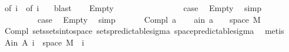 \begin{isabellebody}
\ {\isacharasterisk}{\kern0pt}{\isacharparenleft}{\kern0pt}{}{\isacharparenright}{\kern0pt}{\isacharbrackleft}{\kern0pt}of\ i{\isacharbrackright}{\kern0pt}\ {\isacharasterisk}{\kern0pt}{\isacharparenleft}{\kern0pt}{}{\isacharparenright}{\kern0pt}\ {\isacharasterisk}{\kern0pt}{\isacharasterisk}{\kern0pt}{\isacharparenleft}{\kern0pt}{}{\isacharparenright}{\kern0pt}{\isacharbrackleft}{\kern0pt}of\ i{\isacharbrackright}{\kern0pt}\ {\isacharasterisk}{\kern0pt}{\isacharasterisk}{\kern0pt}{\isacharparenleft}{\kern0pt}{}{\isacharparenright}{\kern0pt}\ \isamarkupfalse%
\ blast{\isacharplus}{\kern0pt}\isanewline
{}\isamarkupfalse%
\isanewline
\ \ \isamarkupfalse%
\ Empty\isanewline
\ \ \isacommand{{\isacharbraceleft}{\kern0pt}}\isamarkupfalse%
\isanewline
\ \ \ \ \isamarkupfalse%
\ {}\isanewline
\ \ \ \ \isamarkupfalse%
\ \isamarkupfalse%
\ {\isacharquery}{\kern0pt}case\ \isamarkupfalse%
\ Empty\ \isamarkupfalse%
\ simp\isanewline
\ \ \isamarkupfalse%
\isanewline
\ \ \ \ \isamarkupfalse%
\ {}\isanewline
\ \ \ \ \isamarkupfalse%
\ \isamarkupfalse%
\ {\isacharquery}{\kern0pt}case\ \isamarkupfalse%
\ Empty\ \isamarkupfalse%
\ simp\isanewline
\ \ \isacommand{{\isacharbraceright}{\kern0pt}}\isamarkupfalse%
\isanewline
{}\isamarkupfalse%
\isanewline
\ \ \isamarkupfalse%
\ {\isacharparenleft}{\kern0pt}Compl\ a{\isacharparenright}{\kern0pt}\isanewline
\ \ \isamarkupfalse%
\ a{\isacharunderscore}{\kern0pt}in{\isacharcolon}{\kern0pt}\ {\isachardoublequoteopen}a\ {\isasymsubseteq}\ {\isacharbraceleft}{\kern0pt}{}{\isachardot}{\kern0pt}{\isachardot}{\kern0pt}{\isacharbraceright}{\kern0pt}\ {\isasymtimes}\ space\ M{\isachardoublequoteclose}\ \isamarkupfalse%
\ Compl{\isacharparenleft}{\kern0pt}{}{\isacharparenright}{\kern0pt}\ sets{\isachardot}{\kern0pt}sets{\isacharunderscore}{\kern0pt}into{\isacharunderscore}{\kern0pt}space\ sets{\isacharunderscore}{\kern0pt}predictable{\isacharunderscore}{\kern0pt}sigma\ space{\isacharunderscore}{\kern0pt}predictable{\isacharunderscore}{\kern0pt}sigma\ \isamarkupfalse%
\ metis\isanewline
\ \ \isamarkupfalse%
\ A{\isacharunderscore}{\kern0pt}in{\isacharcolon}{\kern0pt}\ {\isachardoublequoteopen}A\ i\ {\isasymsubseteq}\ space\ M{\isachardoublequoteclose}\ \ i\ \isamarkupfalse%

\end{isabellebody}
